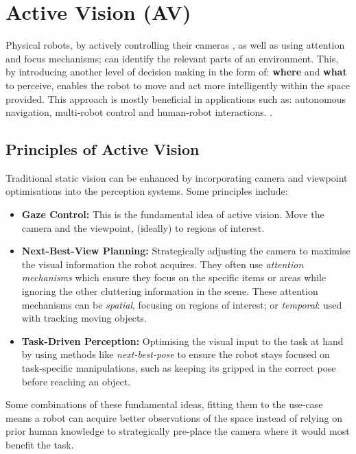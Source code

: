 \section{Active Vision (AV)}
    Physical robots, by actively controlling their cameras \cite{Aloimonos1988}, as well as using attention and focus mechanisms; can identify the relevant parts of an environment. This, by introducing another level of decision making in the form of: \textbf{where} and \textbf{what} to perceive, enables the robot to move and act more intelligently within the space provided. This approach is mostly beneficial in applications such as: autonomous navigation, multi-robot control and human-robot interactions. \cite{breazeal2001hri}.
    
  \subsection{Principles of Active Vision}
  Traditional static vision can be enhanced by incorporating camera and viewpoint optimisations into the perception systems. Some principles include:
  \begin{itemize}
    \item \textbf{Gaze Control:} This is the fundamental idea of active vision. Move the camera and the viewpoint, (ideally) to regions of interest.
    \item \textbf{Next-Best-View Planning:} Strategically adjusting the camera to maximise the visual information the robot acquires. They often use \emph{attention mechanisms} which ensure they focus on the specific items or areas \cite{Burusa_2024} while ignoring the other cluttering information in the scene. These attention mechanisms can be \emph{spatial}, focusing on regions of interest; or \emph{temporal}: used with tracking moving objects.
    \item \textbf{Task-Driven Perception:} Optimising the visual input to the task at hand by using methods like \emph{next-best-pose} to ensure the robot stays focused on task-specific manipulations, such as keeping its gripped in the correct pose before reaching an object.
  \end{itemize}

  Some combinations of these fundamental ideas, fitting them to the use-case means a robot can acquire better observations of the space instead of relying on prior human knowledge to strategically pre-place the camera where it would most benefit the task.

